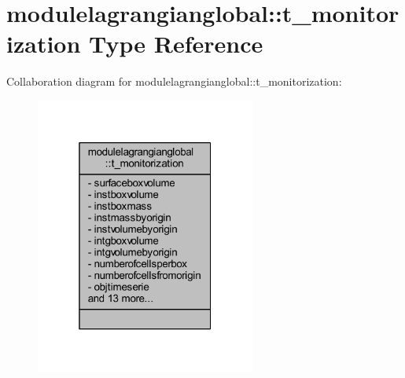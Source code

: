 \hypertarget{structmodulelagrangianglobal_1_1t__monitorization}{}\section{modulelagrangianglobal\+:\+:t\+\_\+monitorization Type Reference}
\label{structmodulelagrangianglobal_1_1t__monitorization}


Collaboration diagram for modulelagrangianglobal\+:\+:t\+\_\+monitorization\+:\nopagebreak
\begin{figure}[H]
\begin{center}
\leavevmode
\includegraphics[width=205pt]{structmodulelagrangianglobal_1_1t__monitorization__coll__graph}
\end{center}
\end{figure}

